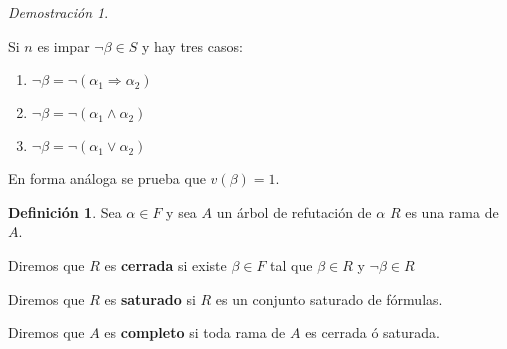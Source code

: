 \documentclass[a4paper,11pt]{article}
\theoremstyle{definition}
\newtheorem{defn}{Definición}[section]
\theoremstyle{remark}
\newtheorem*{demo}{Demostración}
\begin{document}
\begin{demo}
\begin{itemize}
		Si $n$ es impar $\lnot \beta \in S$ y hay tres casos:
		
		\begin{enumerate}[label=\emph{\alph*})]
			\item $\lnot\beta = \lnot(\alpha_1 \Rightarrow \alpha_2)$
			
			\item $\lnot\beta = \lnot(\alpha_1 \wedge \alpha_2)$
			
			\item $\lnot\beta = \lnot(\alpha_1 \vee \alpha_2)$
		\end{enumerate}
		
		En forma análoga se prueba que $v(\beta) = 1$.
	\end{itemize}
\end{demo}

\begin{defn}
	Sea $\alpha \in F$ y sea $A$ un árbol de refutación de $\alpha$ $R$ es una rama de $A$.
	
	Diremos que $R$ es \textbf{cerrada} si existe $\beta \in F$ tal que $\beta \in R$ y 
	$\lnot\beta \in R$
	
	Diremos que $R$ es \textbf{saturado} si $R$ es un conjunto saturado de fórmulas.
	
	Diremos que $A$ es \textbf{completo} si toda rama de $A$ es cerrada ó saturada.
\end{defn}
\end{document}
